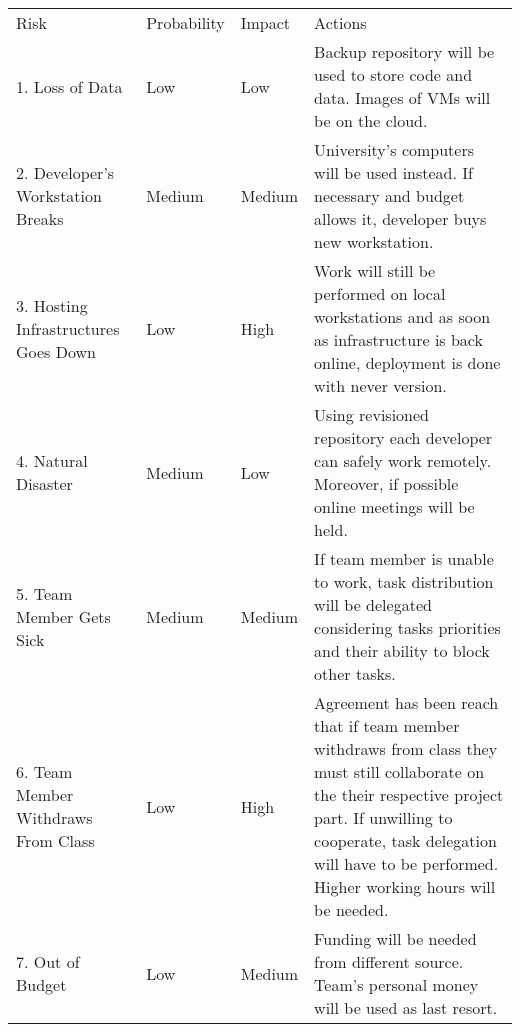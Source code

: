 \begin{center}
\setlength{\extrarowheight}{1.5pt}
    \begin{longtable}{llll}

    Risk & Probability & Impact & Actions \\
    1. Loss of Data    & Low           & Low      & Backup repository will be used to store code and data. Images of VMs will be on the cloud.       \\
    2. Developer's Workstation Breaks  & Medium           & Medium      & University's computers will be used instead. If necessary and budget allows it, developer buys new workstation.       \\
    3. Hosting Infrastructures Goes Down    & Low           & High      & Work will still be performed on local workstations and as soon as infrastructure is back online, deployment is done with never version.       \\
    4. Natural Disaster    & Medium           & Low      & Using revisioned repository each developer can safely work remotely. Moreover, if possible online meetings will be held.       \\
    5. Team Member Gets Sick    & Medium           & Medium      & If team member is unable to work, task distribution will be delegated considering tasks priorities and their ability to block other tasks.       \\
    6. Team Member Withdraws From Class   & Low           & High      & Agreement has been reach that if team member withdraws from class they must still collaborate on the their respective project part. If unwilling to cooperate, task delegation will have to be performed. Higher working hours will be needed.       \\
    7. Out of Budget    & Low           & Medium      & Funding will be needed from different source. Team's personal money will be used as last resort.       \\
    \end{longtable}
\end{center}
